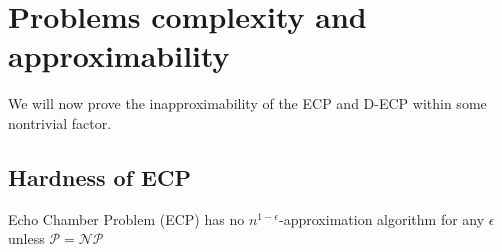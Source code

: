 \chapter{Problems complexity and approximability}%
\label{sec:problem_complexity_and_approximability}

We will now prove the inapproximability of the \acrshort{ECP} and
\acrshort{D-ECP} within some nontrivial factor.

\section{Hardness of \acrshort{ECP}}%
\label{sub:ecp-hardness}

\begin{theorem}
	\label{th:approximability}
	Echo Chamber Problem (ECP) has no $n^{1-\epsilon} $-approximation algorithm for
	any $\epsilon$ unless $\mathcal{P} = \mathcal{NP}  $
\end{theorem}

